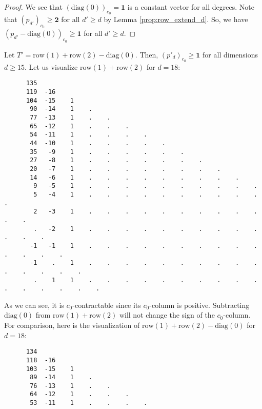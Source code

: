 \begin{proof}
     We see that \( (\mathrm{diag}(0))_{c_0} = \mathbf 1 \) is a constant vector for all degrees. Note that \( (p_{d'})_{c_0} \geq \mathbf 2 \) for all \( d' \geq d \) by Lemma \ref{prop:row_extend_d}. So, we have \( (p_{d'} - \mathrm{diag}(0))_{c_0} \geq \mathbf 1 \) for all \( d' \geq d \).
\end{proof}


\begin{example}
    Let \( T' = \mathrm{row}(1) + \mathrm{row}(2) - \mathrm{diag}(0)\).
    Then, \((p'_d)_{c_0} \geq \mathbf 1 \) for all dimensions \( d \geq 15 \). Let us visualize \( \mathrm{row}(1) + \mathrm{row}(2) \) for \( d = 18 \):
    \begingroup
    \fontsize{8pt}{10pt}\selectfont
    \begin{verbatim}
      135 
      119  -16 
      104  -15    1 
       90  -14    1    . 
       77  -13    1    .    . 
       65  -12    1    .    .    . 
       54  -11    1    .    .    .    . 
       44  -10    1    .    .    .    .    . 
       35   -9    1    .    .    .    .    .    . 
       27   -8    1    .    .    .    .    .    .    . 
       20   -7    1    .    .    .    .    .    .    .    . 
       14   -6    1    .    .    .    .    .    .    .    .    . 
        9   -5    1    .    .    .    .    .    .    .    .    .    . 
        5   -4    1    .    .    .    .    .    .    .    .    .    .    . 
        2   -3    1    .    .    .    .    .    .    .    .    .    .    .    . 
        .   -2    1    .    .    .    .    .    .    .    .    .    .    .    .    . 
       -1   -1    1    .    .    .    .    .    .    .    .    .    .    .    .    .    . 
       -1    .    1    .    .    .    .    .    .    .    .    .    .    .    .    .    .    . 
        .    1    1    .    .    .    .    .    .    .    .    .    .    .    .    .    .    .    .
    \end{verbatim}
    \endgroup
    As we can see, it is \( c_0 \)-contractable since its \( c_0 \)-column is positive. Subtracting \( \mathrm{diag}(0) \) from \( \mathrm{row}(1) + \mathrm{row}(2) \) will not change the sign of the \( c_0 \)-column. For comparison, here is the visualization of \( \mathrm{row}(1) + \mathrm{row}(2) - \mathrm{diag}(0) \) for \( d = 18 \):
    \begingroup
    \fontsize{8pt}{10pt}\selectfont
    \begin{verbatim}
      134 
      118  -16 
      103  -15    1 
       89  -14    1    . 
       76  -13    1    .    . 
       64  -12    1    .    .    . 
       53  -11    1    .    .    .    . 

\end{verbatim}
\end{example}
